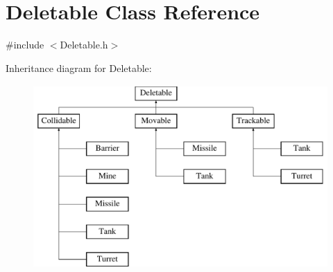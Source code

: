 \hypertarget{classDeletable}{\section{Deletable Class Reference}
\label{classDeletable}
}


{\ttfamily \#include $<$Deletable.\-h$>$}

Inheritance diagram for Deletable\-:\begin{figure}[H]
\begin{center}
\leavevmode
\includegraphics[height=7.000000cm]{classDeletable}
\end{center}
\end{figure}
